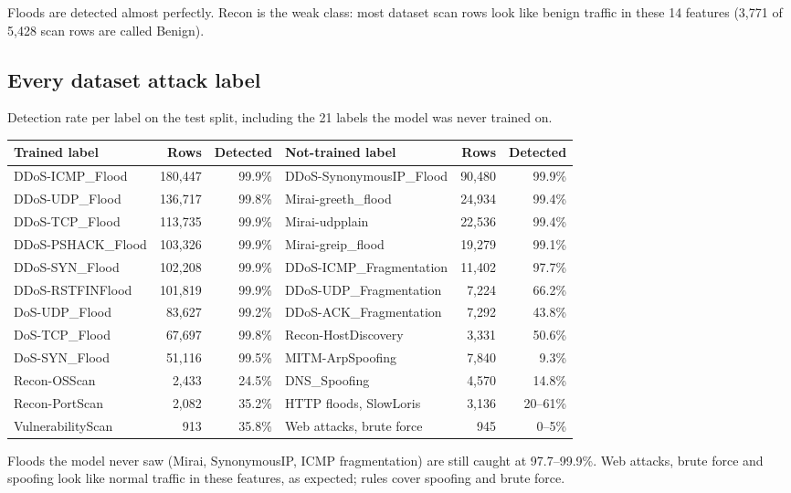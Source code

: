 \documentclass[11pt,a4paper]{article}
\begin{document}
Floods are detected almost perfectly. Recon is the weak class: most dataset scan rows look like benign traffic in
these 14 features (3,771 of 5,428 scan rows are called Benign).

\subsection{Every dataset attack label}

Detection rate per label on the test split, including the 21 labels the model was never trained on.

\begin{center}
\small
\begin{tabular}{lrr@{\hspace{2.2em}}lrr}
\toprule
Trained label & Rows & Detected & Not-trained label & Rows & Detected \\
\midrule
DDoS-ICMP\_Flood & 180,447 & 99.9\% & DDoS-SynonymousIP\_Flood & 90,480 & 99.9\% \\
DDoS-UDP\_Flood & 136,717 & 99.8\% & Mirai-greeth\_flood & 24,934 & 99.4\% \\
DDoS-TCP\_Flood & 113,735 & 99.9\% & Mirai-udpplain & 22,536 & 99.4\% \\
DDoS-PSHACK\_Flood & 103,326 & 99.9\% & Mirai-greip\_flood & 19,279 & 99.1\% \\
DDoS-SYN\_Flood & 102,208 & 99.9\% & DDoS-ICMP\_Fragmentation & 11,402 & 97.7\% \\
DDoS-RSTFINFlood & 101,819 & 99.9\% & DDoS-UDP\_Fragmentation & 7,224 & 66.2\% \\
DoS-UDP\_Flood & 83,627 & 99.2\% & DDoS-ACK\_Fragmentation & 7,292 & 43.8\% \\
DoS-TCP\_Flood & 67,697 & 99.8\% & Recon-HostDiscovery & 3,331 & 50.6\% \\
DoS-SYN\_Flood & 51,116 & 99.5\% & MITM-ArpSpoofing & 7,840 & 9.3\% \\
Recon-OSScan & 2,433 & 24.5\% & DNS\_Spoofing & 4,570 & 14.8\% \\
Recon-PortScan & 2,082 & 35.2\% & HTTP floods, SlowLoris & 3,136 & 20--61\% \\
VulnerabilityScan & 913 & 35.8\% & Web attacks, brute force & 945 & 0--5\% \\
\bottomrule
\end{tabular}
\end{center}

Floods the model never saw (Mirai, SynonymousIP, ICMP fragmentation) are still caught at 97.7--99.9\%. Web attacks,
brute force and spoofing look like normal traffic in these features, as expected; rules cover spoofing and brute
force.
\end{document}
